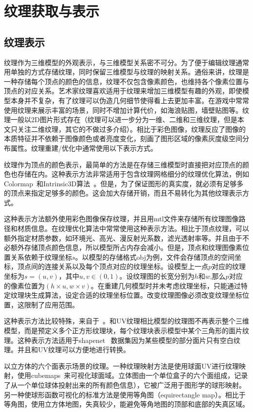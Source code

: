 \section{纹理获取与表示}
\subsection{纹理表示}
纹理作为三维模型的外观表示，与三维模型关系密不可分。为了便于编辑纹理通常用单独的方式存储纹理，同时保留三维模型与纹理的映射关系。通俗来讲，纹理是一种存储每个顶点的颜色的信息，纹理不仅包含像素颜色，也维持各个像素位置与顶点的对应关系。艺术家纹理喜欢适用于纹理来增加三维模型有趣的外观，即使模型本身并不复杂，有了纹理可以伪造几何细节使得看上去更加丰富。在游戏中常常使用纹理来展示丰富的场景，同时不增加计算代价，如海浪贴图，墙壁贴图等。纹理一般以2D图片形式存在（纹理可以进一步分为一维、二维和三维纹理，但是本文只关注二维纹理，其它的不做过多介绍）。相比于彩色图像，纹理反应了图像的本质特征并不依赖于图像颜色或者亮度变化，刻画了图形区域的像素灰度级空间分布属性。纹理重建/优化中通常使用以下表示方式。\par
\vspace*{2mm}纹理作为顶点的颜色表示，最简单的方法是在存储三维模型时直接把对应顶点的颜色也存储在内。这种表示方法非常适用于包含纹理网格细分的纹理优化算法，例如Colormap~\cite{zhou2014color}和Intrinsic3D算法~\cite{RobertMaier2017Intrinsic3DH3}。但是，为了保证图形的真实度，就必须有足够多的顶点来指定足够多的颜色。这会加大存储开销，而且不易转化为其他纹理表示方式。\par
\vspace*{2mm}这种表示方法额外使用彩色图像保存纹理，并且用mtl文件来存储所有纹理图像路径和材质信息。在纹理优化算法中常常使用这种表示方法。相比于顶点纹理，可以额外指定材质参数，如环境光、高光、漫反射光系数，滤光透射率等。并且由于不必额外存储顶点颜色信息，所以模型所占内存会减小。但是，顶点和纹理图像素位置关系依赖于纹理坐标$s$。以模型的存储格式obj为例，文件会存储顶点的空间坐标，顶点间的连接关系以及每个顶点对应的纹理坐标。设模型上一点$p$对应的纹理坐标为$s=(u,v)$，其中$u,v\in(0,1)$。设纹理图的长宽分别为$h\text{和}w$,那么$p$对应的像素位置为$(h\times u,w\times v)$。在重建几何模型时并未考虑纹理坐标，只能通过特定纹理块生成算法，设定合适的纹理坐标位置。改变纹理图像必须改变纹理坐标位置，这限制了应用范围。\par
\vspace*{2mm}这种表示方法比较特殊，来自于~\cite{ShichenLiu2019SoftRA}。和UV纹理相比模型的纹理图不再表示整个三维模型，而是预定义多个正方形纹理块，每个纹理块表示模型中某个三角形的面片纹理。这种表示方法适用于shapenet
~\cite{shapenet2015}数据集因为某些模型的部分面片只有空白纹理。并且和UV纹理可以方便地进行转换。\par
\vspace*{2mm}以立方体的六个面表示场景的纹理。一种纹理映射方法是使用球面UV进行纹理映射，使用cubemaps~\cite{greene1986environment}来可视化球面域。立体图由一个单位盒子的六个面组成，记录了从一个单位球体投射出来的所有颜色信息），它被广泛用于图形学的球形映射。另一种使球形函数可视化的标准方法是使用等角图（equirectangle map）。相比于等角图，使用立方体地图，失真较少，能避免等角地图的顶部和底部的失真区域。\par
